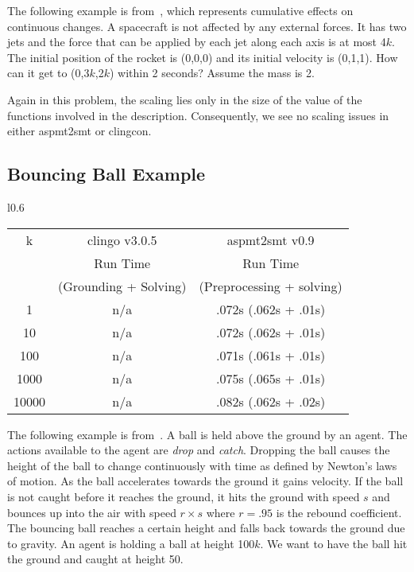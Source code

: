 \documentclass[runningheads]{llncs}
\begin{document}
The following example is from~\cite{lee03}, which represents
cumulative effects on continuous changes. A spacecraft is not
affected by any external forces. It has two jets and the force that
can be applied by each jet along each axis is at most 4$k$. The initial
position of the rocket is (0,0,0) and its initial velocity is
(0,1,1). How can it get to (0,3$k$,2$k$) within 2 seconds? Assume the mass
is 2.

Again in this problem, the scaling lies only in the size of the value of the functions 
involved in the description. Consequently, we see
no scaling issues in either {\sc aspmt2smt} or {\sc clingcon}.

\subsection{Bouncing Ball Example}

\begin{wrapfigure}{l}{0.6\textwidth}
\ \\{\footnotesize
\begin{tabular}{|c|c|c|}
\hline 
k & {\sc clingo} v3.0.5 & {\sc aspmt2smt} v0.9 \\ 
 &  Run Time   & Run Time  \\ 
 & (Grounding + Solving) & (Preprocessing + solving) \\ \hline\hline
1 & n/a & .072s (.062s + .01s) \\\hline
10 & n/a &.072s (.062s + .01s) \\\hline
100 & n/a &.071s (.061s + .01s) \\\hline
1000 & n/a &.075s (.065s + .01s) \\\hline
10000 & n/a &.082s (.062s + .02s) \\\hline
\end{tabular}
}
\end{wrapfigure}

The following example is from~\cite{chintabathina08towards}. %
A ball is held above the ground by an agent. The actions available to
the agent are {\sl drop} and {\sl catch}. Dropping the ball causes the height of
the ball to change continuously with time as defined by Newton's laws
of motion. As the ball accelerates towards the ground it gains
velocity. If the ball is not caught before it reaches the ground, it
hits the ground with speed $s$ and bounces up into the air with speed
$r \times s$ where $r = .95$ is the rebound coefficient. The bouncing ball
reaches a certain height and falls back towards the ground due to
gravity. An agent is holding a ball at height 100$k$. We want to have
the ball hit the ground and caught at height 50.
\end{document}

